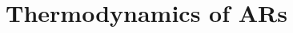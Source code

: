 \documentclass[letterpaper,12pt]{article}
\begin{document}



\section{Thermodynamics of ARs}\label{sec:thermoAR}
\end{document}
